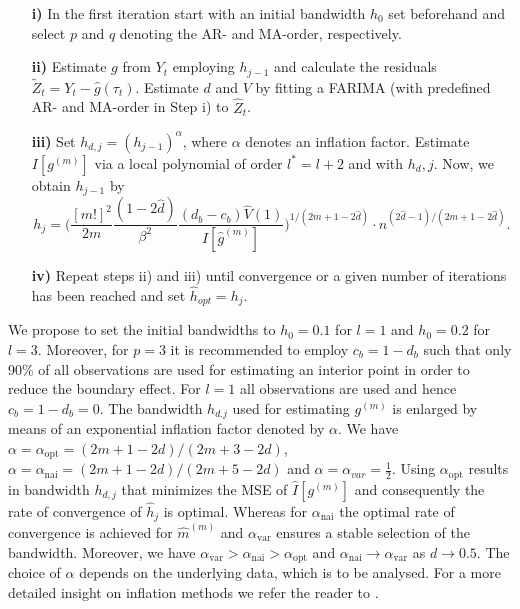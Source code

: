 \documentclass[12pt]{article}
\begin{document}
\begin{itemize}
	\item[\textbf{i)}] In the first iteration start with an initial bandwidth $h_0$ set beforehand and select $p$ and $q$ denoting the AR- and MA-order, respectively. 

	\item [\textbf{ii)}] Estimate $g$ from $Y_t$ employing $h_{j-1}$ and calculate the residuals $\tilde{Z}_t = Y_t - \hat{g}(\tau_t)$. Estimate $d$ and $V$ by fitting a FARIMA (with predefined AR- and MA-order in Step i) to  $\hat{Z}_t$.
			
	\item [\textbf{iii)}] Set $h_{d,j}=(h_{j-1})^\alpha$, where $\alpha$ denotes an 
		inflation factor. Estimate $I[g^{(m)}]$ via a local polynomial of order $l^* = l + 2$ and with $h_d,j$. Now, we obtain $h_{j-1}$ by 
		\begin{equation}
			h_j=\Bigg(\frac{[m!]^2}{2m} \frac{(1-2\hat{d})}{\beta^2}\frac{(d_b - c_b)\hat{V}(1)}{I[\hat{g}^{(m)}]}\Bigg)^{1/(2m+1-2\hat{d})}\cdot n^{(2\hat{d}-1)/(2m+1-2\hat{d})}.
		\end{equation}
	
	\item [\textbf{iv)}] Repeat steps ii) and iii) until convergence or a given number of iterations has been reached and set $\hat{h}_{opt} = h_j$.	
\end{itemize}
We propose to set the initial bandwidths to $h_0 = 0.1$ for $l = 1$ and $h_0 = 0.2$ for $l = 3$. Moreover, for $p = 3$ it is recommended to employ $c_b = 1 - d_b$ such that only 90\% of all observations are used for estimating an interior point in order to reduce the boundary effect. For $l = 1$ all observations are used and hence $c_b = 1 - d_b = 0$. The bandwidth $h_{d.j}$ used for estimating $g^{(m)}$ is enlarged by means of an exponential inflation factor denoted by $\alpha$. We have $\alpha = \alpha_{\text{opt}} = (2m + 1 - 2d) / (2m + 3 - 2d)$, $\alpha = \alpha_{\text{nai}} = (2m + 1 - 2d) / (2m + 5 - 2d)$ and $\alpha = \alpha_{var} = \frac{1}{2}$. Using $\alpha_{\text{opt}}$ results in bandwidth $h_{d,j}$ that minimizes the MSE of $\hat{I}[g^{(m)}]$ and consequently the rate of convergence of $\hat{h}_j$ is optimal. Whereas for $\alpha_{\text{nai}}$ the optimal rate of convergence is achieved for $\hat{m}^{(m)}$ and $\alpha_{\text{var}}$ ensures a stable selection of the bandwidth. Moreover, we have $\alpha_{\text{var}} > \alpha_{\text{nai}} > \alpha_{\text{opt}}$ and $\alpha_{\text{nai}} \rightarrow \alpha_{\text{var}}$ as $d \rightarrow 0.5$. The choice of $\alpha$ depends on the underlying data, which is to be analysed. For a more detailed insight on inflation methods we refer the reader to \citet{beran2002iterative}.   
\end{document}
